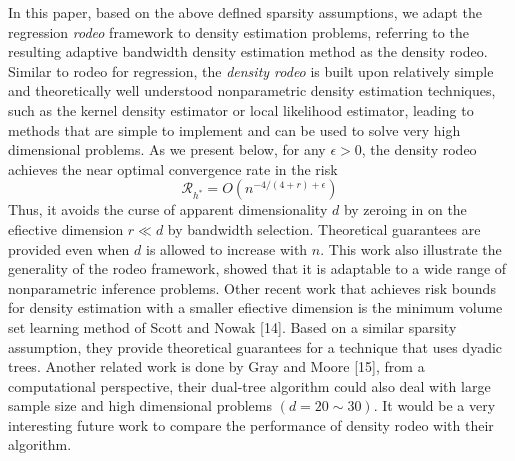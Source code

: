 In this paper, based on the above deflned sparsity assumptions, we adapt the regression \emph{rodeo} framework to density estimation problems, referring to the resulting adaptive bandwidth density estimation method as the density rodeo. 
Similar to rodeo for regression, the \emph{density rodeo} is built upon relatively simple and theoretically well understood nonparametric density estimation techniques, such as the kernel density estimator or local likelihood estimator, leading to methods that are simple to implement and can be used to solve very high dimensional problems. 
As we present below, for any $\epsilon > 0$, the density rodeo achieves the near optimal convergence rate in the risk
\begin{equation}
    \mathcal{R}_{h^{*}}=O\left(n^{-4 /(4+r)+\epsilon}\right)
\end{equation}
Thus, it avoids the curse of apparent dimensionality $d$ by zeroing in on the efiective dimension $r \ll d$ by bandwidth selection. 
Theoretical guarantees are provided even when $d$ is allowed to increase with $n$. 
This work also illustrate the generality of the rodeo framework, showed that it is adaptable to a wide range of nonparametric inference problems. 
Other recent work that achieves risk bounds for density estimation with a smaller efiective dimension is the minimum volume set learning method of Scott and Nowak [14]. 
Based on a similar sparsity assumption, they provide theoretical guarantees for a technique that uses dyadic trees. 
Another related work is done by Gray and Moore [15], from a computational perspective, their dual-tree algorithm could also deal with large sample size and high dimensional problems $(d = 20 \sim 30)$. It would be a very interesting future work to compare the performance of density rodeo with their algorithm. 